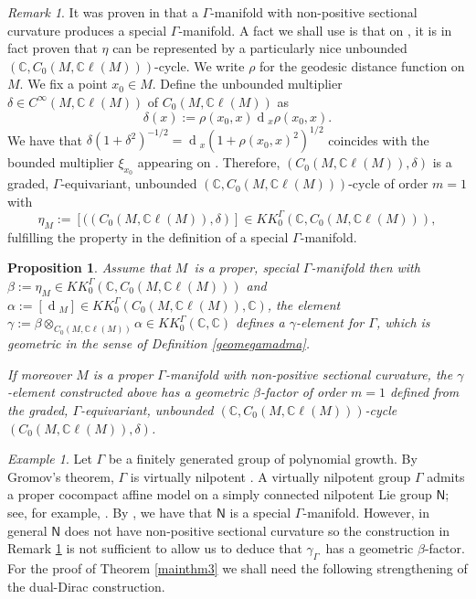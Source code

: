 \documentclass[a4paper,reqno]{amsart}
\numberwithin{equation}{section}
\def\rd{\operatorname{d}\!}
\def\C{\mathbb{C}}
\newtheorem{prop}[thm]{Proposition}
\theoremstyle{definition}
\theoremstyle{remark}
\newtheorem{remark}[thm]{Remark}
\newtheorem{example}[thm]{Example}
\begin{document}
\begin{remark}
\label{rempos}
It was proven in \cite[Page 186]{kaspinv} that a $\Gamma$-manifold with non-positive sectional curvature produces a special $\Gamma$-manifold. A fact we shall use is that on  \cite[Page 186]{kaspinv}, it is in fact proven that $\eta$ can be represented by a particularly nice unbounded $(\C,C_0(M,\C\ell(M)))$-cycle. We write $\rho$ for the geodesic distance function on $M$. We fix a point $x_0\in M$. Define the unbounded multiplier $\delta\in C^\infty(M,\C\ell(M))$ of $C_0(M,\C\ell(M))$ as 
$$\delta(x):=\rho(x_0,x)\rd_x\rho(x_0,x).$$
We have that $\delta(1+\delta^2)^{-1/2}=\rd_x(1+\rho(x_0,x)^2)^{1/2}$ coincides with the bounded multiplier $\xi_{x_0}$ appearing on \cite[Page 186]{kaspinv}. Therefore, $(C_0(M,\C\ell(M)),\delta)$ is a graded, $\Gamma$-equivariant, unbounded $(\C,C_0(M,\C\ell(M)))$-cycle of order $m=1$ with 
$$\eta_M:=[((C_0(M,\C\ell(M)),\delta)]\in KK_0^\Gamma(\C,C_0(M,\C\ell(M))),$$
fulfilling the property in the definition of a special $\Gamma$-manifold.
\end{remark}


\begin{prop}
\label{betarep}
Assume that $M$ is a proper, special $\Gamma$-manifold then with $\beta:=\eta_M \in KK_0^\Gamma(\C,C_0(M,\C\ell(M)))$ and $\alpha:=[\rd_M]\in  KK_0^\Gamma(C_0(M,\C\ell(M)),\C)$, the element $\gamma:=\beta \otimes_{C_0(M,\C\ell(M))}\alpha\in KK^\Gamma_0(\C,\C)$ defines a $\gamma$-element for $\Gamma$, which is geometric in the sense of Definition \ref{geomegamadma}.


If moreover $M$ is a proper $\Gamma$-manifold with non-positive sectional curvature, the $\gamma$-element constructed above has a geometric $\beta$-factor of order $m=1$ defined from the graded, $\Gamma$-equivariant, unbounded $(\C,C_0(M,\C\ell(M)))$-cycle $(C_0(M,\C\ell(M)),\delta)$. 
\end{prop}





\begin{example}
\label{aodknaldn}
Let $\Gamma$ be a finitely generated group of polynomial growth. By Gromov's theorem, $\Gamma$ is virtually nilpotent \cite{Gromov1981}. A virtually nilpotent group $\Gamma$ admits a proper cocompact affine model on a simply connected nilpotent Lie group $\mathsf{N}$; see, for example, \cite{Dekimpe2003}. By \cite[Theorem 5.7]{kaspinv}, we have that $\mathsf{N}$ is a special $\Gamma$-manifold. However, in general $\mathsf{N}$ does not have non-positive sectional curvature so the construction in Remark \ref{rempos} is not sufficient to allow us to deduce that $\gamma_\Gamma$ has a geometric $\beta$-factor. For the proof of Theorem \ref{mainthm3} we shall need the following strengthening of the dual-Dirac construction.
\end{example}
\end{document}
